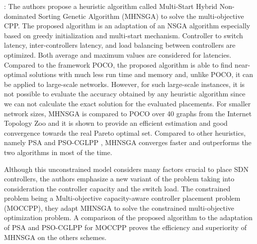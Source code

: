 \documentclass[a4paper,10pt]{article}
\begin{document}



\cite{VaMo18}: The authors propose a heuristic algorithm called Multi-Start Hybrid Non-dominated Sorting Genetic Algorithm (MHNSGA) to solve the multi-objective CPP. The proposed algorithm is an adaptation of an NSGA algorithm especially based on greedy initialization and multi-start mechanism. Controller to switch latency, inter-controllers latency, and load balancing between controllers are optimized. Both average and maximum values are considered for latencies. Compared to the framework POCO, the proposed algorithm is able to find near-optimal solutions with much less run time and memory and, unlike POCO, it can be applied to large-scale networks. However, for such large-scale instances, it is not possible to evaluate the accuracy obtained by any heuristic algorithm since we can not calculate the exact solution for the evaluated placements. For smaller network sizes, MHNSGA is compared to POCO over 40 graphs from the Internet Topology Zoo and it is shown to provide an efficient estimation and good convergence towards the real Pareto optimal set. Compared to other heuristics, namely PSA \cite{LaGe15} and PSO-CGLPP \cite{GaWa15}, MHNSGA converges faster and outperforms the two algorithms in most of the time.  

Although this unconstrained model considers many factors crucial to place SDN controllers, the authors emphasize a new variant of the problem taking into consideration the controller capacity and the switch load. The constrained problem being a Multi-objective capacity-aware controller placement problem (MOCCPP), they adapt MHNSGA to solve the constrained multi-objective optimization problem. A comparison of the proposed algorithm to the adaptation of PSA and  PSO-CGLPP for MOCCPP proves the efficiency and superiority of MHNSGA on the others schemes.
\end{document}
